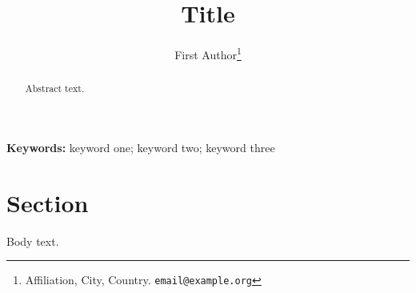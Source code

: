 \documentclass[11pt,a4paper]{article}
\title{Title}
\author{First Author\thanks{Affiliation, City, Country. \texttt{email@example.org}}}
\date{}
\begin{document}
\maketitle

\begin{abstract}
\noindent
Abstract text.
\end{abstract}

\noindent\textbf{Keywords:} keyword one; keyword two; keyword three

\section{Section}
Body text.


% 
% 
\end{document}
